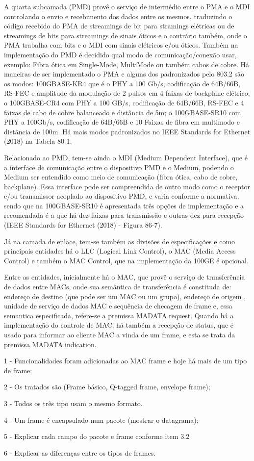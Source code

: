 \documentclass[a4paper,12pt]{article}
\begin{document}
A quarta subcamada (PMD) provê o serviço de intermédio entre o PMA e o MDI controlando o envio e recebimento dos dados entre os mesmos, traduzindo o código recebido do PMA de streamings de bit para stramings elétricas ou de streamings de bits para streamings de sinais óticos e o contrário também, onde o PMA trabalha com bits e o MDI com sinais elétricos e/ou óticos. Também na implementação do PMD é decidido qual modo de comunicação/conexão usar, exemplo: Fibra ótica em Single-Mode, MultiMode ou também cabos de cobre. Há maneiras de ser implementado o PMA e alguns dos padronizados pelo 803.2 são os modos: 100GBASE-KR4 que é o PHY a 100 Gb/s, codificação de 64B/66B, RS-FEC e amplitude da modulação de 2 pulsos em 4 faixas de backplane elétrico; o 100GBASE-CR4 com PHY a 100 GB/s, codificação de 64B/66B, RS-FEC e 4 faixas de cabo de cobre balanceado e distância de 5m; o 100GBASE-SR10 com PHY a 100Gb/s, codificação de 64B/66B e 10 Faixas de fibra em multimodo e distância de 100m. Há mais modos padronizados no IEEE Standards for Ethernet (2018) na Tabela 80-1.

Relacionado ao PMD, tem-se ainda o MDI (Medium Dependent Interface), que é a interface de comunicação entre o dispositivo PMD e o Medium, podendo o Medium ser entendido como meio de comunicação (fibra ótica, cabo de cobre, backplane). Essa interface pode ser compreendida de outro modo como o receptor e/ou transmissor acoplado ao dispositivo PMD, e varia conforme a normativa, sendo que na 100GBASE-SR10 é apresentada três opções de implementação e a recomendada é a que há dez faixas para transmissão e outras dez para recepção (IEEE Standards for Ethernet (2018) - Figura 86-7).

Já na camada de enlace, tem-se também as divisões de especificações e como principais entidades há o LLC (Logical Link Control), o MAC (Media Access Control) e também o MAC Control, que na implementação da 100GE é opcional.

Entre as entidades, inicialmente há o MAC, que provê o serviço de transferência de dados entre MACs, onde sua semântica de transferência é constituda de: endereço de destino (que pode ser um MAC ou um grupo), endereço de origem , unidade de serviço de dados MAC e sequência de checagem de frame e, essa semantica especificada, refere-se a premissa MA\underline{\hspace*{0.14in}}DATA.request. Quando há a implementação do controle de MAC, há também a recepção de status, que é usado para informar ao cliente MAC a vinda de um frame, e esta se trata da premissa MA\underline{\hspace*{0.14in}}DATA.indication.

1 - Funcionalidades foram adicionadas ao MAC frame e hoje há mais de um tipo de frame;

2 - Os tratados são (Frame básico, Q-tagged frame, envelope frame);

3 - Todos os três tipo usam o mesmo formato.

4 - Um frame é encapsulado num pacote (mostrar o datagrama);

5 - Explicar cada campo do pacote e frame conforme item 3.2

6 - Explicar as diferenças entre os tipos de frames.
\end{document}
